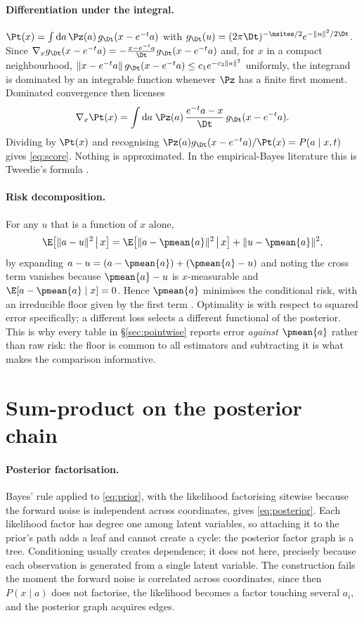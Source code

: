 \paragraph{Differentiation under the integral.}
$\Pt(x) = \int\mathrm{d}a\,\Pz(a)\,g_{\Dt}(x-e^{-t}a)$ with
$g_{\Dt}(u) = (2\pi\Dt)^{-\nsites/2}e^{-\|u\|^2/2\Dt}$. Since
$\nabla_x g_{\Dt}(x-e^{-t}a) = -\frac{x-e^{-t}a}{\Dt}g_{\Dt}(x-e^{-t}a)$ and, for $x$ in a
compact neighbourhood, $\|x-e^{-t}a\|\,g_{\Dt}(x-e^{-t}a) \le c_1 e^{-c_2\|a\|^2}$ uniformly, the
integrand is dominated by an integrable function whenever $\Pz$ has a finite first moment.
Dominated convergence then licenses
\[
\nabla_x \Pt(x)
= \int \mathrm{d}a\; \Pz(a)\,\frac{e^{-t}a - x}{\Dt}\, g_{\Dt}(x-e^{-t}a).
\]
Dividing by $\Pt(x)$ and recognising $\Pz(a)g_{\Dt}(x-e^{-t}a)/\Pt(x) = P(a\mid x,t)$ gives
\eqref{eq:score}. Nothing is approximated. In the empirical-Bayes literature this is Tweedie's
formula \citep{robbins1956,miyasawa1961,efron2011}.

\paragraph{Risk decomposition.} For any $u$ that is a function of $x$ alone,
\begin{equation}
\label{eq:orthogonal}
\E\!\left[\|a-u\|^2 \,\middle|\, x\right]
= \E\!\left[\|a - \pmean{a}\|^2 \,\middle|\, x\right] + \|u - \pmean{a}\|^2 ,
\end{equation}
by expanding $a-u = (a-\pmean{a}) + (\pmean{a}-u)$ and noting the cross term vanishes because
$\pmean{a}-u$ is $x$-measurable and $\E[a-\pmean{a}\mid x]=0$. Hence $\pmean{a}$ minimises the
conditional risk, with an irreducible floor given by the first term \citep{lehmann1998}.
Optimality is with respect to squared error specifically; a different loss selects a different
functional of the posterior. This is why every table in \S\ref{sec:pointwise} reports error
\emph{against} $\pmean{a}$ rather than raw risk: the floor is common to all estimators and
subtracting it is what makes the comparison informative.

\section{Sum-product on the posterior chain}
\label{app:bp}

\paragraph{Posterior factorisation.} Bayes' rule applied to \eqref{eq:prior}, with the likelihood
factorising sitewise because the forward noise is independent across coordinates, gives
\eqref{eq:posterior}. Each likelihood factor has degree one among latent variables, so attaching
it to the prior's path adds a leaf and cannot create a cycle: the posterior factor graph is a
tree. Conditioning usually creates dependence; it does not here, precisely because each
observation is generated from a single latent variable. The construction fails the moment the
forward noise is correlated across coordinates, since then $P(x\mid a)$ does not factorise, the
likelihood becomes a factor touching several $a_i$, and the posterior graph acquires edges.

